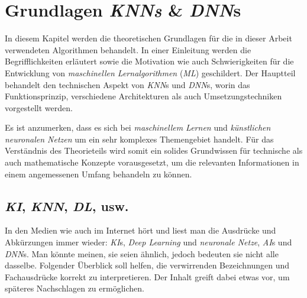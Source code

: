 \section{Grundlagen \textit{KNNs} \& \textit{DNN}s}

In diesem Kapitel werden die theoretischen Grundlagen für die in dieser Arbeit verwendeten Algorithmen behandelt. In einer Einleitung werden die Begrifflichkeiten erläutert sowie die Motivation wie auch Schwierigkeiten für die Entwicklung von \textit{maschinellen Lernalgorithmen} (\textit{ML}) geschildert. Der Hauptteil behandelt den technischen Aspekt von \textit{KNN}s und \textit{DNN}s, worin das Funktionsprinzip, verschiedene Architekturen als auch Umsetzungstechniken vorgestellt werden.

Es ist anzumerken, dass es sich bei \textit{maschinellem Lernen} und \textit{künstlichen neuronalen Netzen} um ein sehr komplexes Themengebiet handelt. Für das Verständnis des Theorieteils wird somit ein solides Grundwissen für technische als auch mathematische Konzepte vorausgesetzt, um die relevanten Informationen in einem angemessenen Umfang behandeln zu können.

\subsection{\textit{KI}, \textit{KNN}, \textit{DL}, usw.}
In den Medien wie auch im Internet hört und liest man die Ausdrücke und Abkürzungen immer wieder: \textit{KI}s, \textit{Deep Learning} und \textit{neuronale Netze}, \textit{AI}s und \textit{DNN}s. Man könnte meinen, sie seien ähnlich, jedoch bedeuten sie nicht alle dasselbe. Folgender Überblick soll helfen, die verwirrenden Bezeichnungen und Fachausdrücke korrekt zu interpretieren. Der Inhalt greift dabei etwas vor, um späteres Nachschlagen zu ermöglichen.

